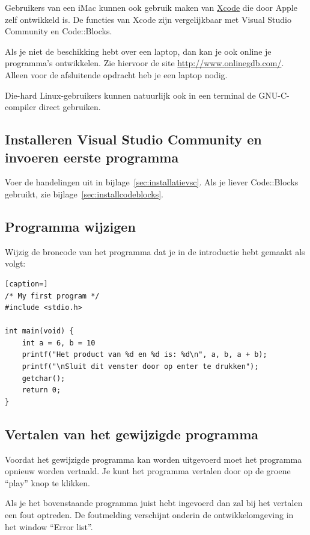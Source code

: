 \documentclass[a4paper,10pt,fleqn,twoside]{article}
\begin{document}
Gebruikers van een iMac kunnen ook gebruik maken van \href{https://developer.apple.com/xcode/}{Xcode} die door Apple zelf ontwikkeld is. De functies van Xcode zijn vergelijkbaar met Visual Studio Community en Code::Blocks.

Als je niet de beschikking hebt over een laptop, dan kan je ook online je programma's ontwikkelen. Zie hiervoor de site \url{http://www.onlinegdb.com/}. Alleen voor de afsluitende opdracht heb je een laptop nodig.

Die-hard Linux-gebruikers kunnen natuurlijk ook in een terminal de GNU-C-compiler direct gebruiken.


%

\subsection{Installeren Visual Studio Community en invoeren eerste programma}

Voer de handelingen uit in bijlage~\ref{sec:installatievsc}. Als je liever Code::Blocks gebruikt, zie bijlage~\ref{sec:installcodeblocks}.

\subsection{Programma wijzigen}
Wijzig de broncode van het programma dat je in de introductie hebt gemaakt als volgt:

\begin{lstlisting}[caption=]
/* My first program */
#include <stdio.h>

int main(void) {
    int a = 6, b = 10
    printf("Het product van %d en %d is: %d\n", a, b, a + b);
    printf("\nSluit dit venster door op enter te drukken");
    getchar();
    return 0;
}
\end{lstlisting}

\subsection{Vertalen van het gewijzigde programma
}Voordat het gewijzigde programma kan worden uitgevoerd moet het programma opnieuw worden vertaald. Je kunt het programma vertalen door op de groene ``play'' knop te klikken.

Als je het bovenstaande programma juist hebt ingevoerd dan zal bij het vertalen een fout optreden. De foutmelding verschijnt onderin de ontwikkelomgeving in het window ``Error list''. 
\end{document}

